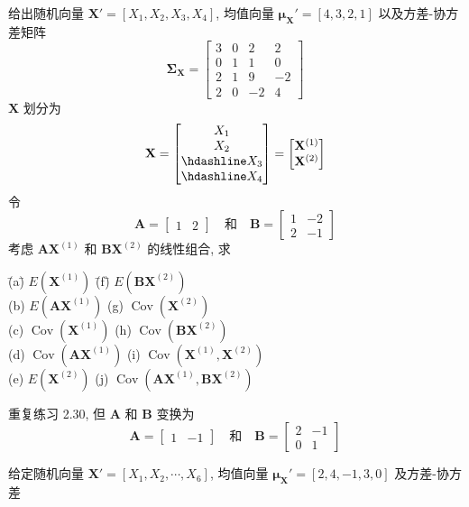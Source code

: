 \medskip
{}\quad 给出随机向量 $\mathbf{X}'=[X_{1},X_{2},X_{3},X_{4}]$, 均值向量 $\boldsymbol{\mu}_{\mathbf{X}}'=[4,3,2,1]$ 以及方差-协方差矩阵
\[
\boldsymbol{\Sigma}_{\mathbf{X}}=\begin{bmatrix}3&0&2&2\\0&1&1&0\\2&1&9&-2\\2&0&-2&4\end{bmatrix}
\]
$\mathbf{X}$ 划分为
\[
\mathbf{X}=\begin{bmatrix}X_{1}\\X_{2}\\\hdashline X_{3}\\\hdashline X_{4}\end{bmatrix}
=\begin{bmatrix}\mathbf{X}^{(1)}\\\mathbf{X}^{(2)}\end{bmatrix}
\]
令
\[
\mathbf{A}=\begin{bmatrix}1&2\end{bmatrix}\quad\text{和}\quad
\mathbf{B}=\begin{bmatrix}1&-2\\2&-1\end{bmatrix}
\]
考虑 $\mathbf{A}\mathbf{X}^{(1)}$ 和 $\mathbf{B}\mathbf{X}^{(2)}$ 的线性组合, 求
\begin{tabbing}
\hspace*{6em}\=(a)\quad \= $E(\mathbf{X}^{(1)})$ \hspace{3em} \=(f)\quad \= $E(\mathbf{B}\mathbf{X}^{(2)})$\\[2pt]
\>(b)\> $E(\mathbf{A}\mathbf{X}^{(1)})$ \>(g)\> $\operatorname{Cov}(\mathbf{X}^{(2)})$\\[2pt]
\>(c)\> $\operatorname{Cov}(\mathbf{X}^{(1)})$ \>(h)\> $\operatorname{Cov}(\mathbf{B}\mathbf{X}^{(2)})$\\[2pt]
\>(d)\> $\operatorname{Cov}(\mathbf{A}\mathbf{X}^{(1)})$ \>(i)\> $\operatorname{Cov}(\mathbf{X}^{(1)},\mathbf{X}^{(2)})$\\[2pt]
\>(e)\> $E(\mathbf{X}^{(2)})$ \>(j)\> $\operatorname{Cov}(\mathbf{A}\mathbf{X}^{(1)},\mathbf{B}\mathbf{X}^{(2)})$
\end{tabbing}

\medskip
{}\quad 重复练习 2.30, 但 $\mathbf{A}$ 和 $\mathbf{B}$ 变换为
\[
\mathbf{A}=\begin{bmatrix}1&-1\end{bmatrix}\quad\text{和}\quad
\mathbf{B}=\begin{bmatrix}2&-1\\0&1\end{bmatrix}
\]

\medskip
{}\quad 给定随机向量 $\mathbf{X}'=[X_{1},X_{2},\cdots,X_{6}]$, 均值向量 $\boldsymbol{\mu}_{\mathbf{X}}'=[2,4,-1,3,0]$ 及方差-协方差
